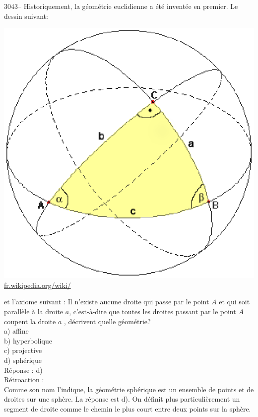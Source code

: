 \documentclass[letterpaper, 12pt]{article}
\begin{document}
3043-- Historiquement, la g\'eom\'etrie euclidienne a \'et\'e invent\'ee en premier. Le dessin suivant:
\begin{center}
\includegraphics[scale=0.5]{geospher.eps}\\
\href{http://fr.wikipedia.org/wiki/Trigonom\%C3\%A9trie sph\%C3\%A9rique}{fr.wikipedia.org/wiki/}\\[5mm]
\end{center}
et l'axiome suivant : \og Il n'existe aucune droite qui passe par le point $A$ et qui soit parall\`ele \`a la droite $a$, c'est-\`a-dire que toutes les droites passant par le point $A$ coupent la droite $a$ \fg, d\'ecrivent quelle g\'eom\'etrie?\\

a) affine\\
b) hyperbolique\\
c) projective\\
d) sph\'erique\\

R\'eponse : d)\\

R\'etroaction :\\
Comme son nom l'indique, la g\'eom\'etrie sph\'erique est un ensemble de points et de droites sur une sph\`ere. La r\'eponse est d). On d\'efinit plus particuli\`erement un segment de droite comme le chemin le plus court entre deux points sur la sph\`ere.\\
\end{document}
